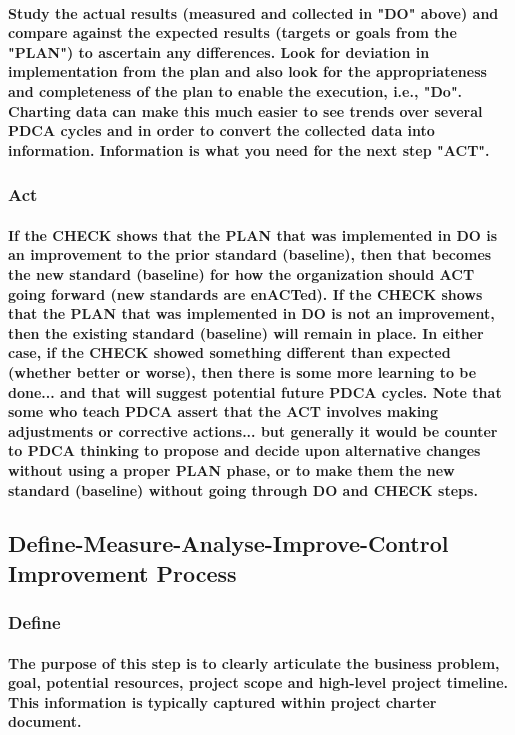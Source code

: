 \documentclass{acm_proc_article-sp}
\begin{document}
\paragraph{Study the actual results (measured and collected in "DO" above) and compare against the expected results (targets or goals from the "PLAN") to ascertain any differences. Look for deviation in implementation from the plan and also look for the appropriateness and completeness of the plan to enable the execution, i.e., "Do". Charting data can make this much easier to see trends over several PDCA cycles and in order to convert the collected data into information. Information is what you need for the next step "ACT".}
\subsubsection{Act}
\paragraph{If the CHECK shows that the PLAN that was implemented in DO is an improvement to the prior standard (baseline), then that becomes the new standard (baseline) for how the organization should ACT going forward (new standards are enACTed). If the CHECK shows that the PLAN that was implemented in DO is not an improvement, then the existing standard (baseline) will remain in place. In either case, if the CHECK showed something different than expected (whether better or worse), then there is some more learning to be done... and that will suggest potential future PDCA cycles. Note that some who teach PDCA assert that the ACT involves making adjustments or corrective actions... but generally it would be counter to PDCA thinking to propose and decide upon alternative changes without using a proper PLAN phase, or to make them the new standard (baseline) without going through DO and CHECK steps.}
\subsection{Define-Measure-Analyse-Improve-Control Improvement Process}
\subsubsection{Define}
\paragraph{The purpose of this step is to clearly articulate the business problem, goal, potential resources, project scope and high-level project timeline. This information is typically captured within project charter document.}
\end{document}

